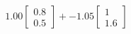 \documentclass[preview]{standalone}
\begin{document}
\begin{align*}
1.00 \begin{bmatrix} 0.8 \\ 0.5 \end{bmatrix} + -1.05 \begin{bmatrix} 1 \\ 1.6 \end{bmatrix}
\end{align*}
\end{document}
